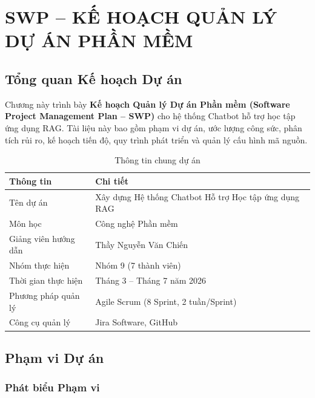\chapter{SWP -- KẾ HOẠCH QUẢN LÝ DỰ ÁN PHẦN MỀM}

\section{Tổng quan Kế hoạch Dự án}

Chương này trình bày \textbf{Kế hoạch Quản lý Dự án Phần mềm (Software Project Management Plan -- SWP)} cho hệ thống Chatbot hỗ trợ học tập ứng dụng RAG. Tài liệu này bao gồm phạm vi dự án, ước lượng công sức, phân tích rủi ro, kế hoạch tiến độ, quy trình phát triển và quản lý cấu hình mã nguồn.

\begin{table}[H]
  \centering
  \caption{Thông tin chung dự án}
  \label{tab:project-info}
  \renewcommand{\arraystretch}{1.4}
  \begin{tabularx}{\textwidth}{|l|X|}
    \hline
    \rowcolor{blue!10}
    \textbf{Thông tin} & \textbf{Chi tiết} \\
    \hline
    Tên dự án & Xây dựng Hệ thống Chatbot Hỗ trợ Học tập ứng dụng RAG \\
    \hline
    Môn học & Công nghệ Phần mềm \\
    \hline
    Giảng viên hướng dẫn & Thầy Nguyễn Văn Chiến \\
    \hline
    Nhóm thực hiện & Nhóm 9 (7 thành viên) \\
    \hline
    Thời gian thực hiện & Tháng 3 -- Tháng 7 năm 2026 \\
    \hline
    Phương pháp quản lý & Agile Scrum (8 Sprint, 2 tuần/Sprint) \\
    \hline
    Công cụ quản lý & Jira Software, GitHub \\
    \hline
  \end{tabularx}
\end{table}

\section{Phạm vi Dự án}

\subsection{Phát biểu Phạm vi}

